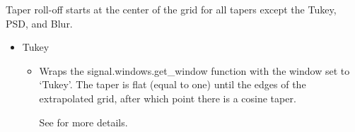 \documentclass[letterpaper,10pt,english,openany,oneside]{sphinxmanual}
\begin{document}
Taper roll-off starts at the center of the grid for all tapers except the Tukey, PSD, and Blur.
\begin{itemize}
\item {} 
Tukey
\begin{itemize}
\item {} 
Wraps the signal.windows.get\_window function with the window set to ‘Tukey’. The taper is flat (equal to one) until the edges of the extrapolated grid, after which point there is a cosine taper. %
\begin{footnote}[1]\sphinxAtStartFootnote
See  for more details.
%
\end{footnote}

\end{itemize}

\end{itemize}
\end{document}

